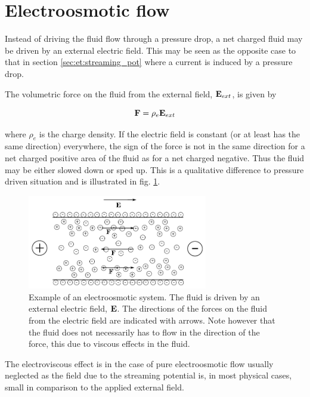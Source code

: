 \section{Electroosmotic flow}\label{sec:et:electroosmosis}
Instead of driving the fluid flow through a pressure drop, a net
charged fluid may be driven by an external electric field. This may
be seen as the opposite case to that in section
\ref{sec:et:streaming_pot} where a current is induced by a pressure
drop.

The volumetric force on the fluid from the external field, $\mathbf{E}_{ext}$,
is given by

\begin{equation}
\mathbf{F} = \mathrm{\rho}_e \mathbf{E}_{ext}
\end{equation}

where $\rho_e$ is the charge density. If the electric field is
constant (or at least has the same direction) everywhere, the sign of
the force is not in the same direction for a net charged positive area
of the fluid as for a net charged negative. Thus the fluid may be
either slowed down or sped up. This is a qualitative difference to
pressure driven situation and is illustrated in fig. \ref{fig:et:eo}.

\begin{figure}
\begin{center}
\includegraphics[width=0.7\textwidth]{fig/channel_electroosmosis.pdf}
\end{center}
\caption{Example of an electroosmotic system. The fluid is driven by
  an external electric field, $\mathbf{E}$. The directions of the forces on
  the fluid from the electric field are indicated with arrows. Note
  however that the fluid does not necessarily has to flow in the
  direction of the force, this due to viscous effects in the fluid. }
\label{fig:et:eo}
\end{figure}

The electroviscous effect is in the case of pure electroosmotic flow
usually neglected as the field due to the streaming potential is, in
most physical cases, small in comparison to the applied external
field. \cite{wang-poi}
